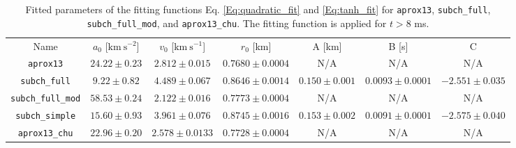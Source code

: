 \documentclass[preprint,times,tighten]{aastex631}
\begin{document}
\begin{table*}
\caption{\label{Tab:network_fitted_param}
Fitted parameters of the fitting functions Eq. \ref{Eq:quadratic_fit} and \ref{Eq:tanh_fit} for {\tt aprox13}, {\tt subch\_full}, {\tt subch\_full\_mod}, and {\tt aprox13\_chu}. The fitting function is applied for $t > 8$ ms.
}

\begin{ruledtabular}
\footnotesize
\centering
\begin{tabular}{ccccccc}
\small 
Name &
$a_0$ [$\mbox{km} \ \mbox{s}^{-2}$] &
$v_0$ [$\mbox{km} \ \mbox{s}^{-1}$] &
$r_0$ [km] &
A [km]&
B [s]&
C

\\ 
\colrule
{\tt aprox13} & $24.22 \pm 0.23$ & $2.812 \pm 0.015$ & $0.7680\pm 0.0004 $ & N/A & N/A & N/A\\

{\tt subch\_full} & $9.22 \pm 0.82$ & $4.489 \pm 0.067$ & $0.8646 \pm 0.0014$ & $0.150 \pm 0.001$ & $0.0093 \pm 0.0001$ & $-2.551 \pm 0.035$ \\

{\tt subch\_full\_mod} & $58.53 \pm 0.24$ & $2.122 \pm 0.016$ & $0.7773 \pm 0.0004$ & N/A & N/A & N/A \\

{\tt subch\_simple} & $15.60 \pm 0.93$ & $3.961 \pm 0.076$ & $0.8745 \pm 0.0016$ & $0.153 \pm 0.002$ & $0.0091 \pm 0.0001$ & $-2.575 \pm 0.040$\\
 
{\tt aprox13\_chu} & $22.96 \pm 0.20$ & $2.578 \pm 0.0133$ & $0.7728 \pm 0.0004$ & N/A & N/A & N/A\\
 


\end{tabular}
\end{ruledtabular}
\end{table*}
\end{document}
